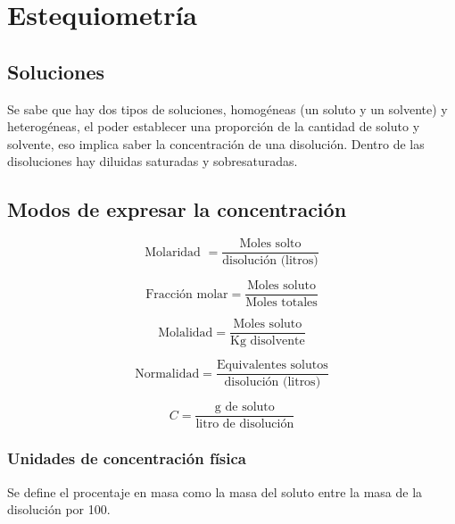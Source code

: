 

\section{Estequiometría}

\subsection{Soluciones}

Se sabe que hay dos tipos de soluciones, homogéneas (un soluto y un solvente) y heterogéneas,
el poder establecer una proporción de la cantidad de soluto y solvente, eso implica saber la concentración de una disolución.
Dentro de las disoluciones hay diluidas saturadas y sobresaturadas.

\subsection{Modos de expresar la concentración}

\begin{equation}
	\text{Molaridad }=\frac{\text{Moles solto}}{\text{disolución (litros)}}
\end{equation}

\begin{equation}
	\text{Fracción molar}=\frac{\text{Moles soluto}}{\text{Moles totales}}
\end{equation}

\begin{equation}
	\text{Molalidad}= \frac{\text{Moles soluto}}{\text{Kg disolvente}}
\end{equation}

\begin{equation}
	\text{Normalidad}=\frac{\text{Equivalentes solutos}}{\text{disolución (litros)}}
\end{equation}

\begin{equation}
	C=\frac{\text{g de soluto}}{\text{litro de disolución}}
\end{equation}

\subsubsection{Unidades de concentración física}
Se define el procentaje en masa como la masa del soluto entre la masa de la disolución por 100.

